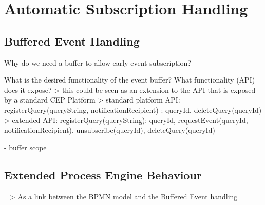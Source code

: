 \chapter{Automatic Subscription Handling}\label{ch:automaticsubscription}

\section{Buffered Event Handling}
Why do we need a buffer to allow early event subscription?

What is the desired functionality of the event buffer? What functionality (API) does it expose?
> this could be seen as an extension to the API that is exposed by a standard CEP Platform
> standard platform API: registerQuery(queryString, notificationRecipient) : queryId, deleteQuery(queryId)
> extended API: registerQuery(queryString): queryId, requestEvent(queryId, notificationRecipient), unsubscribe(queryId), deleteQuery(queryId)


- buffer scope


\section{Extended Process Engine Behaviour}
=> As a link between the BPMN model and the Buffered Event handling

